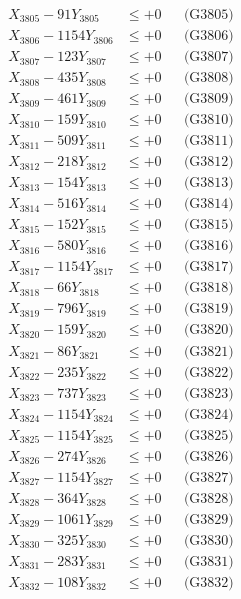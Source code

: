 \documentclass[a4paper,10pt]{article}
\begin{document}
{\begin{align}
X_{3805} - 91Y_{3805} &\leq +0 && \text{(G3805)} \\
X_{3806} - 1154Y_{3806} &\leq +0 && \text{(G3806)} \\
X_{3807} - 123Y_{3807} &\leq +0 && \text{(G3807)} \\
X_{3808} - 435Y_{3808} &\leq +0 && \text{(G3808)} \\
X_{3809} - 461Y_{3809} &\leq +0 && \text{(G3809)} \\
X_{3810} - 159Y_{3810} &\leq +0 && \text{(G3810)} \\
\allowbreak
X_{3811} - 509Y_{3811} &\leq +0 && \text{(G3811)} \\
X_{3812} - 218Y_{3812} &\leq +0 && \text{(G3812)} \\
X_{3813} - 154Y_{3813} &\leq +0 && \text{(G3813)} \\
X_{3814} - 516Y_{3814} &\leq +0 && \text{(G3814)} \\
X_{3815} - 152Y_{3815} &\leq +0 && \text{(G3815)} \\
X_{3816} - 580Y_{3816} &\leq +0 && \text{(G3816)} \\
X_{3817} - 1154Y_{3817} &\leq +0 && \text{(G3817)} \\
X_{3818} - 66Y_{3818} &\leq +0 && \text{(G3818)} \\
X_{3819} - 796Y_{3819} &\leq +0 && \text{(G3819)} \\
X_{3820} - 159Y_{3820} &\leq +0 && \text{(G3820)} \\
\allowbreak
X_{3821} - 86Y_{3821} &\leq +0 && \text{(G3821)} \\
X_{3822} - 235Y_{3822} &\leq +0 && \text{(G3822)} \\
X_{3823} - 737Y_{3823} &\leq +0 && \text{(G3823)} \\
X_{3824} - 1154Y_{3824} &\leq +0 && \text{(G3824)} \\
X_{3825} - 1154Y_{3825} &\leq +0 && \text{(G3825)} \\
X_{3826} - 274Y_{3826} &\leq +0 && \text{(G3826)} \\
X_{3827} - 1154Y_{3827} &\leq +0 && \text{(G3827)} \\
X_{3828} - 364Y_{3828} &\leq +0 && \text{(G3828)} \\
X_{3829} - 1061Y_{3829} &\leq +0 && \text{(G3829)} \\
X_{3830} - 325Y_{3830} &\leq +0 && \text{(G3830)} \\
\allowbreak
X_{3831} - 283Y_{3831} &\leq +0 && \text{(G3831)} \\
X_{3832} - 108Y_{3832} &\leq +0 && \text{(G3832)} \\

\end{align}}
\end{document}
